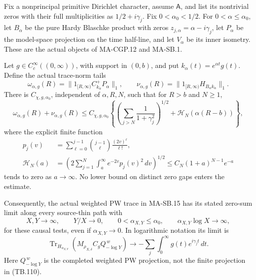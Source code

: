 \begin{theorem}
Fix a nonprincipal primitive Dirichlet character, assume
\(\mathsf A\), and list its nontrivial zeros with their
full multiplicities as \(1/2+i\gamma_j\).
Fix \(0<\alpha_0<1/2\).
For \(0<\alpha\leq\alpha_0\), let \(B_\alpha\) be the
pure Hardy Blaschke product with zeros
\(z_{j,\alpha}=\alpha-i\gamma_j\), let \(P_\alpha\)
be the model-space projection on the time half-line,
and let \(V_\alpha\) be its inner isometry.
These are the actual objects of MA-CGP.12 and MA-SB.1.

Let \(g\in C_c^\infty((0,\infty))\), with support in
\((0,b)\), and put \(k_\alpha(t)=e^{\alpha t}g(t)\).
Define the actual trace-norm tails
\[
 \omega_{\alpha,g}(R)
   =\|1_{[R,\infty)}C_{k_\alpha}^+P_\alpha\|_1,\qquad
 \nu_{\alpha,g}(R)
   =\|1_{[R,\infty)}H_{B_\alpha k_\alpha}\|_1.
 \tag{TB.114}
\]
There is \(C_{\chi,g,\alpha_0}\), independent of
\(\alpha,R,N\), such that for \(R>b\) and \(N\geq1\),
\[
 \omega_{\alpha,g}(R)+\nu_{\alpha,g}(R)
 \leq C_{\chi,g,\alpha_0}
       \left\{\left(\sum_{j>N}\frac1{1+\gamma_j^2}\right)^{1/2}
                        +\mathcal H_N(\alpha(R-b))\right\},
 \tag{TB.115}
\]
where the explicit finite function
\[
 \begin{split}
 p_j(v)&=\sum_{\ell=0}^{j-1}
              \binom{j-1}{\ell}\frac{(2v)^\ell}{\ell!},\\
 \mathcal H_N(a)&=
       \left(2\sum_{j=1}^N
                \int_a^\infty e^{-2v}p_j(v)^2\,dv\right)^{1/2}
       \leq C_N(1+a)^{N-1}e^{-a}
 \end{split}
 \tag{TB.116}
\]
tends to zero as \(a\to\infty\).
No lower bound on distinct zero gaps enters the estimate.

Consequently, the actual weighted PW trace in
MA-SB.15 has its stated zero-sum limit along every
source-thin path with
\[
 X,Y\longrightarrow\infty,\qquad Y/X\longrightarrow0,
 \qquad 0<\alpha_{X,Y}\leq\alpha_0,\qquad
             \alpha_{X,Y}\log X\longrightarrow\infty,
 \tag{TB.117}
\]
for these causal tests, even if \(\alpha_{X,Y}\to0\).
In logarithmic notation its limit is
\[
 \operatorname{Tr}_{H_{\alpha_{X,Y}}}
       (M_{\rho_{X,\delta}}C_gQ^{\,w}_{-\log Y})
       \longrightarrow
       -\sum_j\int_0^\infty g(t)e^{i\gamma_jt}\,dt.
 \tag{TB.118}
\]
Here \(Q^{\,w}_{-\log Y}\) is the completed weighted
PW projection, not the finite projection in (TB.110).
\end{theorem}
